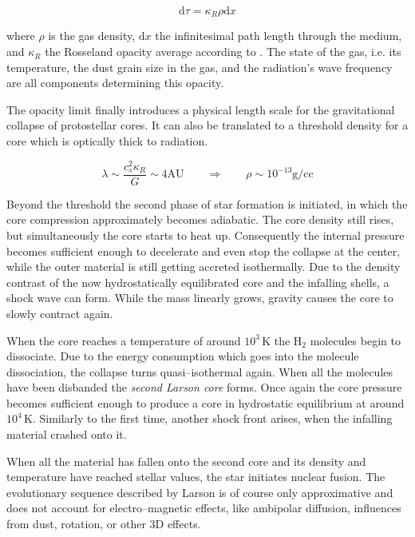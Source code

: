 \begin{equation}
 \mathrm{d}\tau = \kappa_{R}\rho\mathrm{d}x
\end{equation}

where $\rho$ is the gas density, $\mathrm{d}x$ the infinitesimal path length through the medium, and $\kappa_{R}$ the Rosseland opacity average according to \citet{Davisetal}.
The state of the gas, i.e. its temperature, the dust grain size in the gas, and the radiation's wave frequency are all components determining this opacity.

The opacity limit finally introduces a physical length scale for the gravitational collapse of protostellar cores.
It can also be translated to a threshold density for a core which is optically thick to radiation.

\begin{equation}
 \lambda \sim \frac{c_{s}^{2}\kappa_{R}}{G} \sim 4 \text{AU} \qquad \Rightarrow \qquad \rho \sim 10^{-13} \text{g/cc}
\end{equation}

Beyond the threshold the second phase of star formation is initiated, in which the core compression approximately becomes adiabatic.
The core density still rises, but simultaneously the core starts to heat up.
Consequently the internal pressure becomes sufficient enough to decelerate and even stop the collapse at the center, while the outer material is still getting accreted isothermally.
Due to the density contrast of the now hydrostatically equilibrated core and the infalling shells, a shock wave can form.
While the mass linearly grows, gravity causes the core to slowly contract again.

When the core reaches a temperature of around $10^{3}\,\text{K}$ the H$_{2}$ molecules begin to dissociate.
Due to the energy consumption which goes into the molecule dissociation, the collapse turns quasi--isothermal again.
When all the molecules have been disbanded the \textit{second Larson core} forms.
Once again the core pressure becomes sufficient enough to produce a core in hydrostatic equilibrium at around $10^{4}\,\text{K}$.
Similarly to the first time, another shock front arises, when the infalling material crashed onto it.

When all the material has fallen onto the second core and its density and temperature have reached stellar values, the star initiates nuclear fusion.
The evolutionary sequence described by Larson is of course only approximative and does not account for electro--magnetic effects, like ambipolar diffusion, influences from dust, rotation, or other 3D effects.


